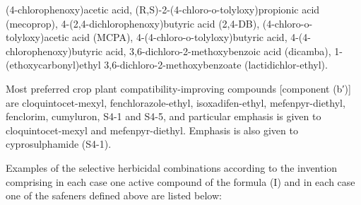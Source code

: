 \documentclass[11pt,a4paper]{article}
\begin{document}
(4-chlorophenoxy)acetic acid, (R,S)-2-(4-chloro-o-tolyloxy)propionic acid (mecoprop), 4-(2,4-dichlorophenoxy)butyric acid (2,4-DB), (4-chloro-o-tolyloxy)acetic acid (MCPA), 4-(4-chloro-o-tolyloxy)butyric acid, 4-(4-chlorophenoxy)butyric acid, 3,6-dichloro-2-methoxybenzoic acid (dicamba), 1-(ethoxycarbonyl)ethyl 3,6-dichloro-2-methoxybenzoate (lactidichlor-ethyl).

Most preferred crop plant compatibility-improving compounds [component (b′)] are cloquintocet-mexyl, fenchlorazole-ethyl, isoxadifen-ethyl, mefenpyr-diethyl, fenclorim, cumyluron, S4-1 and S4-5, and particular emphasis is given to cloquintocet-mexyl and mefenpyr-diethyl. Emphasis is also given to cyprosulphamide (S4-1).

Examples of the selective herbicidal combinations according to the invention comprising in each case one active compound of the formula (I) and in each case one of the safeners defined above are listed below:
\end{document}
